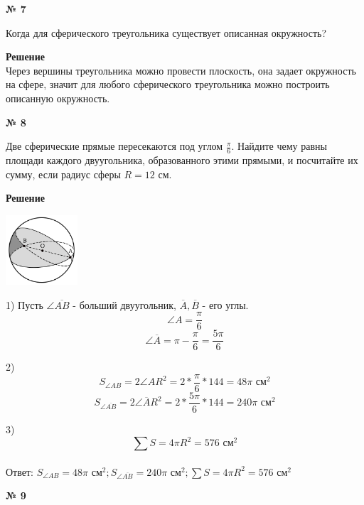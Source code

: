     \begin{center}
        \textbf{№ 7}
    \end{center}
    Когда для сферического треугольника существует описанная окружность?

    \textbf{Решение}\\

    Через вершины треугольника можно провести плоскость, она задает окружность на сфере,
    значит для любого сферического треугольника можно построить описанную окружность.

    \begin{center}
        \textbf{№ 8}
    \end{center}
    Две сферические прямые пересекаются под углом $\frac{\pi}{6}$.
    Найдите чему равны площади каждого двуугольника, образованного этими прямыми, и посчитайте их сумму,
    если радиус сферы $R=12$ см.

    \textbf{Решение}\\

    \begin{center}
        \includegraphics[width=0.2\textwidth]{images/img3}\\
    \end{center}


    1) Пусть $\angle \overline {AB}$ - больший двуугольник, $\overline A, \overline B$ - его углы.
    \[
        \angle A = \frac{\pi}{6}
    \]
    \[ \angle \overline A = \pi - \frac{\pi}{6} = \frac{5\pi}{6}\]

    2)
    \[
        S_{\angle AB} = 2\angle A R ^ 2 = 2 * \frac{\pi}{6} *  144 = 48\pi \text{ см}^2
    \]
    \[
        S_{\angle \overline{AB}} = 2\angle \overline A R ^ 2 = 2 * \frac{5\pi}{6} *  144 = 240\pi \text{ см}^2
    \]

    3)
    \[
        \sum S = 4\pi R ^ 2 = 576 \text{ см}^2
    \]\\

    Ответ: $S_{\angle AB} = 48\pi \text{ см}^2; S_{\angle \overline{AB}} = 240\pi \text{ см}^2; \sum S = 4\pi R ^ 2 = 576 \text{ см}^2$

    \begin{center}
        \textbf{№ 9}
    \end{center}

